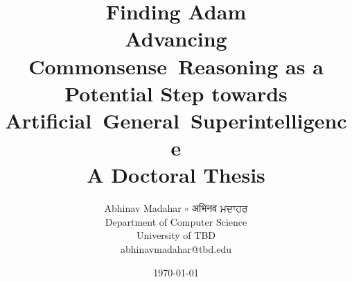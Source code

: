 \title{
    {\huge \textbf{Finding Adam}} \\
    Advancing Commonsense~Reasoning as a Potential Step towards Artificial~General~Superintelligence
    \vspace{1cm} \\
    A Doctoral Thesis}

\author{
    Abhinav Madahar $\circ$ {\devanagari अभिनव } {\gurmukhi ਮਦਾਹਰ} \\
    Department of Computer Science \\
    University of TBD \\
    {\small abhinavmadahar@tbd.edu}}

\date{\today}

\maketitle{}
